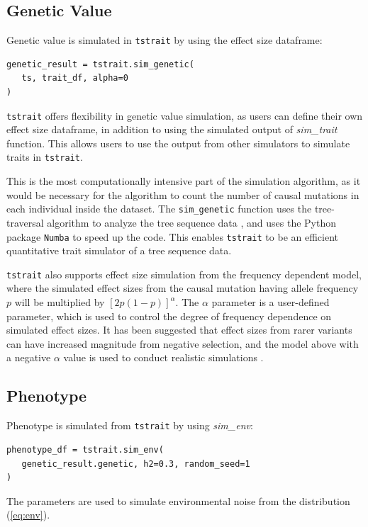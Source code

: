 \documentclass[unnumsec,webpdf,modern,large,namedate]{oup-authoring-template}%
\theoremstyle{thmstyleone}%
\theoremstyle{thmstyletwo}%
\theoremstyle{thmstylethree}%
\begin{document}
\subsection{Genetic Value}

Genetic value is simulated in \texttt{tstrait} by using the effect size dataframe:
\begin{verbatim}
genetic_result = tstrait.sim_genetic(
   ts, trait_df, alpha=0
)
\end{verbatim}
\texttt{tstrait} offers flexibility in genetic value simulation, as users can define their own effect size dataframe, in addition to using the simulated output of \emph{sim\_trait} function. This allows users to use the output from other simulators to simulate traits in \texttt{tstrait}.

This is the most computationally intensive part of the simulation algorithm, as it would be necessary for the algorithm to count the number of causal mutations in each individual inside the dataset. The \texttt{sim\_genetic} function uses the tree-traversal algorithm to analyze the tree sequence data \citep{ralph2020}, and uses the Python package \texttt{Numba} \citep{numba} to speed up the code. This enables \texttt{tstrait} to be an efficient quantitative trait simulator of a tree sequence data.

\texttt{tstrait} also supports effect size simulation from the frequency dependent model, where the simulated effect sizes from the causal mutation having allele frequency $p$ will be multiplied by $[2p(1-p)]^\alpha$. The $\alpha$ parameter is a user-defined parameter, which is used to control the degree of frequency dependence on simulated effect sizes. It has been suggested that effect sizes from rarer variants can have increased magnitude from negative selection, and the model above with a negative $\alpha$ value is used to conduct realistic simulations \citep{speed2017}.

\subsection{Phenotype}

Phenotype is simulated from \texttt{tstrait} by using \emph{sim\_env}:
\begin{verbatim}
phenotype_df = tstrait.sim_env(
   genetic_result.genetic, h2=0.3, random_seed=1
)
\end{verbatim}
The parameters are used to simulate environmental noise from the distribution (\ref{eq:env}).
\end{document}
